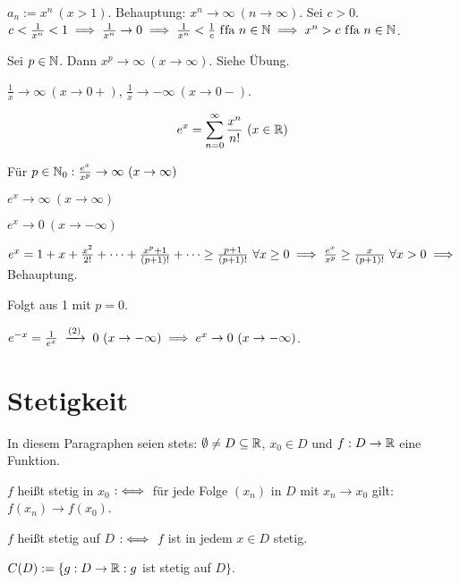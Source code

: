 \documentclass[a4paper,oneside,DIV15,BCOR12mm]{scrbook}
\begin{document}
\begin{beispiele}
\item $a_n := x^n\ (x > 1)$. Behauptung: $x^n\to \infty \ (n\to\infty)$. Sei $c>0$. $c<\frac{1}{x^n}<1 \implies \frac{1}{x^n} \to 0 \implies \frac{1}{x^n}<\frac{1}{c} \text{ f\/fa } n\in\mathbb{N} \implies x^n > c \text{ f\/fa } n\in\mathbb{N}$.
\item Sei $p\in\mathbb{N}$. Dann $x^p \to \infty \ (x\to\infty)$. Siehe Übung.
\item $\frac{1}{x} \to \infty \ (x \to 0+)$, $\frac{1}{x} \to -\infty \ (x\to 0-)$.
\end{beispiele}

\begin{satz}
$$e^x = \sum_{n=0}^{\infty} \frac{x^n}{n!} \ (x\in\mathbb{R})$$
\begin{liste}
\item Für $p\in\mathbb{N}_0: \frac{e^x}{x^p} \to \infty\ (x\to\infty)$
\item $e^x \to \infty \ (x\to\infty)$
\item $e^x \to 0 \ (x\to-\infty)$
\end{liste}
\end{satz}

\begin{beweis}
\begin{liste}
\item $e^x = 1 + x + \frac{x^2}{2!} + \cdots + \frac{x^p+1}{(p+1)!} + \cdots \ge \frac{p+1}{(p+1)!} \ \forall x \ge 0 \implies \frac{e^x}{x^p} \ge \frac{x}{(p+1)!} \ \forall x>0 \implies$ Behauptung.
\item Folgt aus 1 mit $p = 0$.
\item $e^{-x} = \frac{1}{e^x} \tonach{(2)} 0 \ (x \to -\infty) \folgt e^x \to 0 \ (x \to -\infty)$.
\end{liste}
\end{beweis}

\chapter{Stetigkeit}

\begin{vereinbarung}
In diesem Paragraphen seien stets: $\emptyset \neq D \subseteq \mathbb{R}$, $x_0 \in D$ und $f:D \to \mathbb{R}$ eine Funktion.
\end{vereinbarung}

\begin{definition}
\begin{liste}
\item $f$ heißt stetig in $x_0$ $:\iff$ für jede Folge $(x_n)$ in $D$ mit $x_n \to x_0$ gilt: $f(x_n) \to f(x_0)$.
\item $f$ heißt stetig auf $D$ $:\iff$ $f$ ist in jedem $x\in D$ stetig.
\item $C(D) := \{ g: D \to \mathbb{R}: g$ ist stetig auf $D\}$.
\end{liste}
\end{definition}
\end{document}
